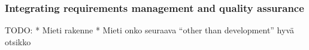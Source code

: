 \documentclass[preprint,authoryear,12pt]{elsarticle}
\begin{document}

%






\subsubsection{Integrating requirements management and quality assurance}

TODO:
* Mieti rakenne
* Mieti onko seuraava ``other than development'' hyvä otsikko
\end{document}
